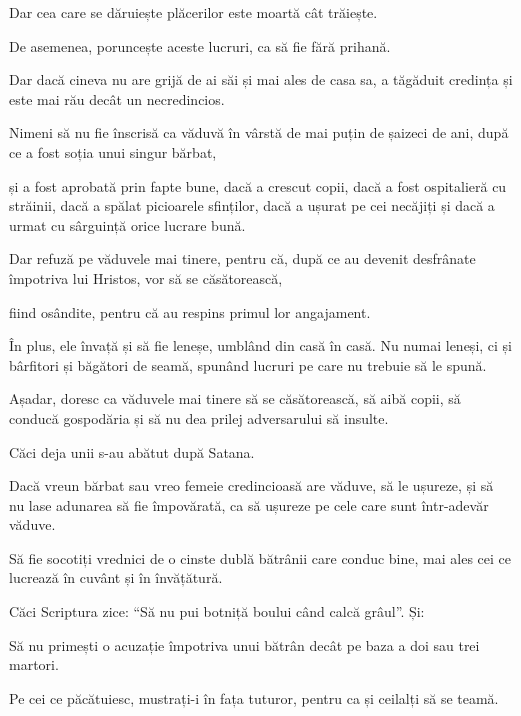 {Dar cea care se dăruiește plăcerilor este moartă cât trăiește.

De asemenea, poruncește aceste lucruri, ca să fie fără prihană.

Dar dacă cineva nu are grijă de ai săi și mai ales de casa sa, a tăgăduit credința și este mai rău decât un necredincios.


\par }{\PP {}Nimeni să nu fie înscrisă ca văduvă în vârstă de mai puțin de șaizeci de ani, după ce a fost soția unui singur bărbat,

și a fost aprobată prin fapte bune, dacă a crescut copii, dacă a fost ospitalieră cu străinii, dacă a spălat picioarele sfinților, dacă a ușurat pe cei necăjiți și dacă a urmat cu sârguință orice lucrare bună.


\par }{\PP {}Dar refuză pe văduvele mai tinere, pentru că, după ce au devenit desfrânate împotriva lui Hristos, vor să se căsătorească,

fiind osândite, pentru că au respins primul lor angajament.

În plus, ele învață și să fie leneșe, umblând din casă în casă. Nu numai leneși, ci și bârfitori și băgători de seamă, spunând lucruri pe care nu trebuie să le spună.

Așadar, doresc ca văduvele mai tinere să se căsătorească, să aibă copii, să conducă gospodăria și să nu dea prilej adversarului să insulte.

Căci deja unii s-au abătut după Satana.

Dacă vreun bărbat sau vreo femeie credincioasă are văduve, să le ușureze, și să nu lase adunarea să fie împovărată, ca să ușureze pe cele care sunt într-adevăr văduve.


\par }{\PP {}Să fie socotiți vrednici de o cinste dublă bătrânii care conduc bine, mai ales cei ce lucrează în cuvânt și în învățătură.

Căci Scriptura zice: “Să nu pui botniță boului când calcă grâul”. Și:
{}


\par }{\PP {}Să nu primești o acuzație împotriva unui bătrân decât pe baza a doi sau trei martori.

Pe cei ce păcătuiesc, mustrați-i în fața tuturor, pentru ca și ceilalți să se teamă.

}
